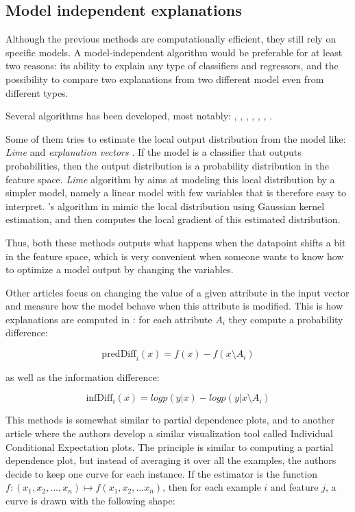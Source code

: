 \documentclass[a4paper]{article}
\begin{document}
\subsection{Model independent explanations}

Although the previous methods are computationally efficient, they still rely on specific models. A model-independent algorithm would be preferable for at least two reasons: its ability to explain any type of classifiers and regressors, and the possibility to compare two explanations from two different model even from different types.

Several algorithms has been developed, most notably: \cite{lime}, \cite{explvect}, \cite{explainingclassif}, \cite{evolutionnary}, \cite{gametheory}, \cite{ice}, \cite{sensitivity}.

Some of them tries to estimate the local output distribution from the model like: \textit{Lime} \cite{lime} and \textit{explanation vectors} \cite{explvect}. If the model is a classifier that outputs probabilities, then the output distribution is a probability distribution in the feature space. \textit{Lime} algorithm by \citeauthor{lime} \cite{lime} aims at modeling this local distribution by a simpler model, namely a linear model with few variables that is therefore easy to interpret. \citeauthor{explvect}'s algorithm in \cite{explvect} mimic the local distribution using Gaussian kernel estimation, and then computes the local gradient of this estimated distribution.

Thus, both these methods outputs what happens when the datapoint shifts a bit in the feature space, which is very convenient when someone wants to know how to optimize a model output by changing the variables.

Other articles focus on changing the value of a given attribute in the input vector and measure how the model behave when this attribute is modified. This is how explanations are computed in  \cite{explainingclassif}: for each attribute $A_i$ they compute a probability difference:

\[
	\text{predDiff}_i(x) = f(x) - f(x \setminus A_i)
\]

as well as the information difference:

\[
	\text{infDiff}_i(x) = log p(y | x) - log p(y | x \setminus A_i)
\] 

This methods is somewhat similar to partial dependence plots, and to another article \cite{ice} where the authors develop a similar visualization tool called Individual Conditional Expectation plots. The principle is similar to computing a partial dependence plot, but instead of averaging it over all the examples, the authors decide to keep one curve for each instance. If the estimator is the function $f : (x_1, x_2, ..., x_n) \mapsto f(x_1, x_2, ... x_n)$, then for each example $i$ and feature $j$, a curve is drawn with the following shape:
\end{document}
